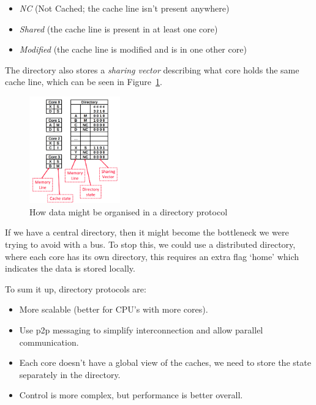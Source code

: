 \begin{itemize}
  \item \textit{NC} (Not Cached; the cache line isn't present anywhere)
  \item \textit{Shared} (the cache line is present in at least one core)
  \item \textit{Modified} (the cache line is modified and is in one other core)
\end{itemize}

The directory also stores a \textit{sharing vector} describing what core holds
the same cache line, which can be seen in Figure~\ref{directory-protocol}.

\begin{figure}
  \centering
  \vspace{-2em}
  \includegraphics[width=0.35\textwidth]{images/directory-protocol}
  \caption{How data might be organised in a directory protocol}
  \label{directory-protocol}
\end{figure}

If we have a central directory, then it might become the bottleneck we were
trying to avoid with a bus. To stop this, we could use a distributed directory,
where each core has its own directory, this requires an extra flag `home' which
indicates the data is stored locally.

To sum it up, directory protocols are:

\begin{itemize}
  \item More scalable (better for CPU's with more cores).
  \item Use p2p messaging to simplify interconnection and allow parallel
    communication.
  \item Each core doesn't have a global view of the caches, we need to store the
    state separately in the directory.
  \item Control is more complex, but performance is better overall.
\end{itemize} 

